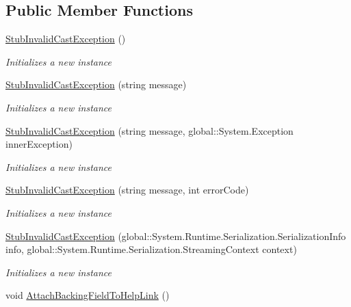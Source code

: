 \subsection*{Public Member Functions}
\begin{DoxyCompactItemize}
\item 
\hyperlink{class_system_1_1_fakes_1_1_stub_invalid_cast_exception_a7903a108ba66b965292a9dd0e72888a7}{Stub\-Invalid\-Cast\-Exception} ()
\begin{DoxyCompactList}\small\item\em Initializes a new instance\end{DoxyCompactList}\item 
\hyperlink{class_system_1_1_fakes_1_1_stub_invalid_cast_exception_ade7d9f4820db5cd1885661bf2871f868}{Stub\-Invalid\-Cast\-Exception} (string message)
\begin{DoxyCompactList}\small\item\em Initializes a new instance\end{DoxyCompactList}\item 
\hyperlink{class_system_1_1_fakes_1_1_stub_invalid_cast_exception_a3fda412eaf6c90148780889de48014dd}{Stub\-Invalid\-Cast\-Exception} (string message, global\-::\-System.\-Exception inner\-Exception)
\begin{DoxyCompactList}\small\item\em Initializes a new instance\end{DoxyCompactList}\item 
\hyperlink{class_system_1_1_fakes_1_1_stub_invalid_cast_exception_afd928dc287aa4b7290d1c12a83bfb372}{Stub\-Invalid\-Cast\-Exception} (string message, int error\-Code)
\begin{DoxyCompactList}\small\item\em Initializes a new instance\end{DoxyCompactList}\item 
\hyperlink{class_system_1_1_fakes_1_1_stub_invalid_cast_exception_af7a3e93f8b29ae1b0ac8e5c0352146b1}{Stub\-Invalid\-Cast\-Exception} (global\-::\-System.\-Runtime.\-Serialization.\-Serialization\-Info info, global\-::\-System.\-Runtime.\-Serialization.\-Streaming\-Context context)
\begin{DoxyCompactList}\small\item\em Initializes a new instance\end{DoxyCompactList}\item 
void \hyperlink{class_system_1_1_fakes_1_1_stub_invalid_cast_exception_a7b20a5f336c4a6475f1fa5ba33b4ed77}{Attach\-Backing\-Field\-To\-Help\-Link} ()

\end{DoxyCompactItemize}

